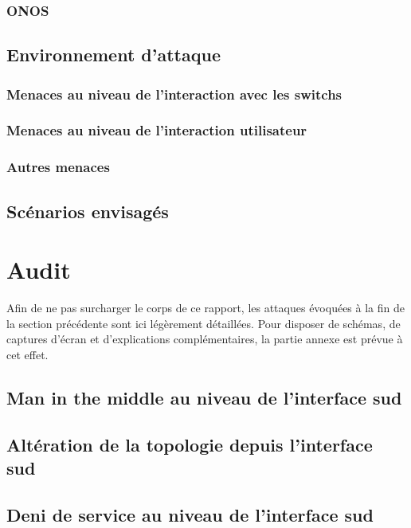 \documentclass[11pt]{article}
\begin{document}
		\subsubsection{ONOS}
			
	\subsection{Environnement d'attaque}
		
		\subsubsection{Menaces au niveau de l'interaction avec les switchs}
			
		\subsubsection{Menaces au niveau de l'interaction utilisateur}
			
		\subsubsection{Autres menaces}
			
	\subsection{Scénarios envisagés}
		
\newpage
{}
\section{Audit}
	Afin de ne pas surcharger le corps de ce rapport, les attaques évoquées à la fin de la section précédente sont ici légèrement détaillées. Pour disposer de schémas, de captures d'écran et d'explications complémentaires, la partie annexe est prévue à cet effet.
	\subsection{Man in the middle au niveau de l'interface sud}
		
		\newpage
	\subsection{Altération de la topologie depuis l'interface sud}
		
		\newpage
	\subsection{Deni de service au niveau de l'interface sud}
		
		\newpage
\end{document}
